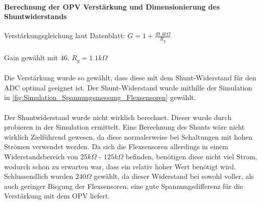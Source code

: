 \documentclass[titlepage,12pt,twoside]{article}
\begin{document}
\paragraph{Berechnung der OPV Verstärkung und Dimensionierung des Shuntwiderstands}
\hfill \break
\hfill \break
\hspace*{1cm} Verstärkungsgleichung laut Datenblatt: $ G = 1+\frac{49.4k\Omega}{R_{g}} $ \\
\\
\hspace*{1cm} Gain gewählt mit 46. \hspace*{1cm} $ R_{g} = 1.1k\Omega $ \\
\\
Die Verstärkung wurde so gewählt, dass diese mit dem Shunt-Widerstand für den ADC optimal geeignet ist.
Der Shunt-Widerstand wurde mithilfe der Simulation in \autoref{fig:Simulation_Spannungsmessung_Flexsensoren}
gewählt. \\
\\
Der Shuntwiderstand wurde nicht wirklich berechnet. Dieser wurde durch probieren in der Simulation ermittelt. Eine Berechnung
des Shunts wäre nicht wirklich Zielführend gewesen, da diese normalerweise bei Schaltungen mit hohen Strömen verwendet werden. 
Da sich die Flexsensoren allerdings in einem Widerstandsbereich von $25k\Omega$ - $125k\Omega$ befinden, benötigen diese nicht
viel Strom, wodurch schon zu erwarten war, dass ein relativ hoher Wert benötigt wird. Schlussendlich wurden $240\Omega$ gewählt,
da dieser Widerstand bei sowohl voller, als auch geringer Biegung der Flexsensoren, eine gute Spannungsdifferenz für die 
Verstärkung mit dem OPV liefert. \\
\\
\end{document}
